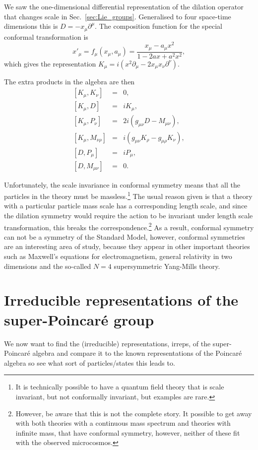 \documentclass[notes.tex]{subfiles}
\begin{document}
We saw the one-dimensional differential representation of the dilation operator that changes scale in Sec.~\ref{sec:Lie_groups}. Generalised to four space-time dimensions this is $D=-x_\mu\partial^\mu$. The composition function for the special conformal transformation is
\begin{equation}
x'_\mu=f_\mu(x_\mu,a_\mu)=\frac{x_\mu-a_\mu x^2}{1-2ax+a^2x^2},
\end{equation}
which gives the representation $K_\mu=i(x^2\partial_\mu-2x_\mu x_\nu\partial^\nu)$.

The extra products in the algebra are then
\begin{eqnarray}
\left[K_\mu, K_\nu \right] &=& 0, \\
\left[K_\mu, D \right] &=& iK_\mu, \\
\left[K_\mu, P_\nu \right] &=& 2i(g_{\mu\nu}D-M_{\mu\nu}), \\
\left[K_\mu, M_{\nu\rho} \right] &=& i(g_{\mu\nu}K_\rho-g_{\mu\rho}K_\nu), \\
\left[D, P_\mu \right] &=& iP_\mu, \\
\left[D, M_{\mu\nu}\right] &=& 0.
\end{eqnarray}

Unfortunately, the scale invariance in conformal symmetry means that all the particles in the theory must be massless.\footnote{It is technically possible to have a quantum field theory that is scale invariant, but not conformally invariant, but examples are rare.}  The usual reason given is that a theory with a particular particle mass scale has a corresponding length scale, and since the dilation symmetry would require the action to be invariant under length scale transformation, this breaks the correspondence.\footnote{However, be aware that this is not the complete story. It possible to get away with both theories with a continuous mass spectrum and theories with infinite mass, that have conformal symmetry, however, neither of these fit with the observed microcosmos.}
As a result, conformal symmetry can not be a symmetry of the Standard Model, however, conformal symmetries are an interesting area of study, because they appear in other important theories such as Maxwell's equations for electromagnetism, general relativity in two dimensions and the so-called $N=4$ supersymmetric Yang-Mills theory.



\section{Irreducible representations of the super-Poincaré group}
We now want to find the (irreducible) representations, irreps, of the super-Poincaré algebra and compare it to the known representations of the Poincaré algebra so see what sort of particles/states this leads to.
\end{document}
